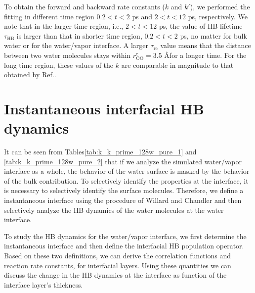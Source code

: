 To obtain the forward and backward rate constants ($k$ and $k'$),
we performed the fitting in different time region $0.2 < t < 2$ ps and $2 < t < 12$ ps, respectively.
We note that in the larger time region, i.e., $2 < t < 12$ ps, the value of HB lifetime $\tau_\text{HB}$ is larger than that in shorter time region, $0.2 < t < 2$ ps,
no matter for bulk water or for the water/vapor interface. A larger $\tau_\text{re}$ value means that the distance between two water molecules 
stays within $r_\text{OO}^c= 3.5$ \AA for a longer time. 
For the long time region, these values of the $k$ are comparable in magnitude to that obtained by Ref.. 


\section{Instantaneous interfacial HB dynamics}\label{PARA_IHB}
It can be seen from Tables\thinspace\ref{tab:k_k_prime_128w_pure_1} and \ref{tab:k_k_prime_128w_pure_2} that 
if we analyze the simulated water/vapor interface as a whole, the behavior of the water surface is masked by the behavior of the bulk contribution.
To selectively identify the properties at the interface, it is necessary to selectively identify the surface molecules.
Therefore, we define a instantaneous interface using the procedure of Willard and Chandler\cite{Willard2010} and then selectively analyze the HB dynamics of the water molecules
at the water interface.

To study the HB dynamics for the water/vapor interface, we first determine the instantaneous interface and then define the interfacial HB population operator. 
Based on these two definitions, we can derive the correlation functions and reaction rate constants, for interfacial layers. 
Using these quantities we can discuss the change in the HB dynamics at the interface as function of the interface layer's thickness.


